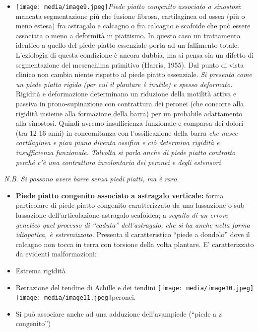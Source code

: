 \documentclass[]{article}
\begin{document}
\begin{itemize}
\item
  \texttt{[image: media/image9.jpeg]}\emph{Piede
  piatto congenito associato a sinostosi}: mancata segmentazione più che
  fusione fibrosa, cartilaginea od ossea (più o meno estesa) fra
  astragalo e calcagno o fra calcagno e scafoide che può essere
  associata o meno a deformità in piattismo. In questo caso un
  trattamento identico a quello del piede piatto essenziale porta ad un
  fallimento totale. L'eziologia di questa condizione è ancora dubbia,
  ma si pensa sia un difetto di segmentazione del mesenchima primitivo
  (Harris, 1955). Dal punto di vista clinico non cambia niente rispetto
  al piede piatto essenziale. \emph{Si presenta come un piede piatto
  rigido (per cui il plantare è inutile) \emph{e spesso deformato}.}
  Rigidità e deformazione determinano un riduzione della motilità attiva
  e passiva in prono-supinazione con contrattura dei peronei (che
  concorre alla rigidità insieme alla formazione della barra) per un
  probabile adattamento alla sinostosi. Quindi avremo insufficienza
  funzionale e comparsa dei dolori (tra 12-16 anni) in concomitanza con
  l'ossificazione della barra \emph{che nasce cartilaginea e pian piano
  diventa ossifica e ciò determina rigidità e insufficienza funzionale.
  Talvolta si parla anche di piede piatto contratto perché c'è una
  contrattura involontaria dei peronei e degli estensori}
\end{itemize}

\emph{N.B. Si possono avere barre senza piedi piatti, ma è raro.}

\begin{itemize}
\item
  \textbf{Piede piatto congenito associato a astragalo verticale:} forma
  particolare di piede piatto congenito caratterizzato da una lussazione
  o sub-lussazione dell'articolazione astragalo scafoidea; a
  \emph{seguito di un errore genetico quel processo di ``caduta''
  dell'astragalo, che si ha anche nella forma idiopatica, è
  estremizzato.} Presenta il caratteristico ``piede a dondolo'' dove il
  calcagno non tocca in terra con torsione della volta plantare. E'
  caratterizzato da evidenti malformazioni:
\end{itemize}

\begin{itemize}
\item
  Estrema rigidità
\item
  Retrazione del tendine di Achille e dei tendini
  \texttt{[image: media/image10.jpeg]}\texttt{[image: media/image11.jpeg]}peronei.
\item
  Si può associare anche ad una adduzione dell'avampiede (``piede a z
  congenito'')
\end{itemize}
\end{document}
